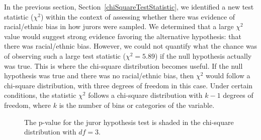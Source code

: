 


In the previous section, Section~\ref{chiSquareTestStatistic}, we identified a new test statistic ($\chi^2$) within the context of assessing whether there was evidence of racial/ethnic bias in how jurors were sampled. %
%
We determined that a large $\chi^2$ value would suggest strong evidence favoring the alternative hypothesis: that there was racial/ethnic bias. However, we could not quantify what the chance was of observing such a large test statistic ($\chi^2=5.89$) if the null hypothesis actually was true. This is where the chi-square distribution becomes useful. If the null hypothesis was true and there was no racial/ethnic bias, then $\chi^2$ would follow a chi-square distribution, with three degrees of freedom in this case. Under certain conditions, the statistic $\chi^2$ follows a chi-square distribution with $k-1$ degrees of freedom, where $k$ is the number of bins or categories of the variable.

\begin{figure}[h]
\centering
{}
\caption{The p-value for the juror hypothesis test is shaded in the chi-square distribution with $df=3$.}
\label{jurorHTPValueShown}
\end{figure}

